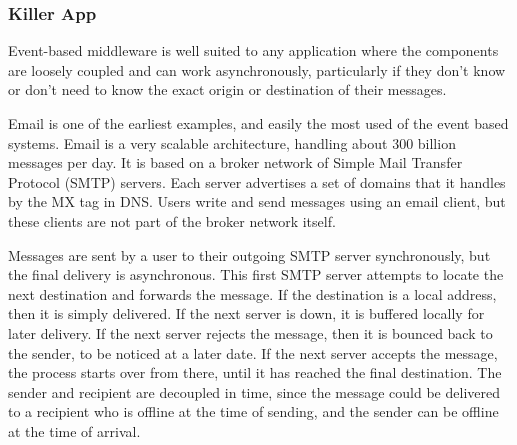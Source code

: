 \documentclass{acm_proc_article-sp}
\begin{document}


\subsubsection{Killer App}
\label{sec:appsebgood}


Event-based middleware is well suited to any application where the components are loosely coupled and can work asynchronously, particularly if they don't know or don't need to know the exact origin or destination of their messages.

Email is one of the earliest examples, and easily the most used of the event based systems. Email is a very scalable architecture, handling about 300 billion messages per day. It is based on a broker network of Simple Mail Transfer Protocol (SMTP) servers. Each server advertises a set of domains that it handles by the MX tag in DNS. Users write and send messages using an email client, but these clients are not part of the broker network itself.

Messages are sent by a user to their outgoing SMTP server synchronously, but the final delivery is asynchronous. This first SMTP server attempts to locate the next destination and forwards the message. If the destination is a local address, then it is simply delivered. If the next server is down, it is buffered locally for later delivery. If the next server rejects the message, then it is bounced back to the sender, to be noticed at a later date. If the next server accepts the message, the process starts over from there, until it has reached the final destination. The sender and recipient are decoupled in time, since the message could be delivered to a recipient who is offline at the time of sending, and the sender can be offline at the time of arrival.
\end{document}
